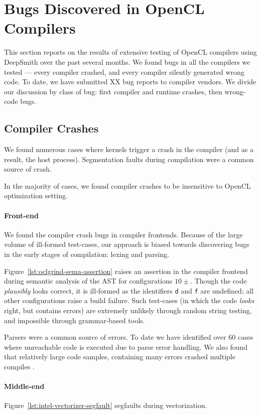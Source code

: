 \section{Bugs Discovered in OpenCL Compilers}

This section reports on the results of extensive testing of OpenCL compilers using DeepSmith over the past several months. We found bugs in all the compilers we tested --- every compiler crashed, and every compiler silently generated wrong code. To date, we have submitted XX bug reports to compiler vendors. We divide our discussion by class of bug: first compiler and runtime crashes, then wrong-code bugs.

\subsection{Compiler Crashes}

We found numerous cases where kernels trigger a crash in the compiler (and as a result, the host process). Segmentation faults during compilation were a common source of crash.

In the majority of cases, we found compiler crashes to be insensitive to OpenCL optimization setting.


\paragraph{Front-end} We found the compiler crash bugs in compiler frontends. Because of the large volume of ill-formed test-cases, our approach is biased towards discovering bugs in the early stages of compilation: lexing and parsing.

Figure~\ref{lst:oclgrind-sema-assertion} raises an assertion in the compiler frontend during semantic analysis of the AST for configurations $10\pm$. Though the code \emph{plausibly} looks correct, it is ill-formed as the identifiers \texttt{d} and \texttt{f} are undefined; all other configurations raise a build failure. Such test-cases (in which the code \emph{looks} right, but contains errors) are extremely unlikely through random string testing, and impossible through grammar-based tools.

Parsers were a common source of errors. To date we have identified over 60 cases where unreachable code is executed due to parse error handling. We also found that relatively large code samples, containing many errors crashed multiple compiles .

\paragraph{Middle-end} Figure~\ref{lst:intel-vectorizer-segfault} segfaults during vectorization.

